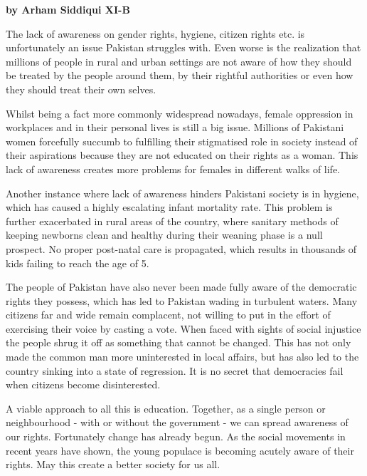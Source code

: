 \documentclass{article}
\begin{document}


\textbf{by Arham Siddiqui XI-B}

The lack of awareness on gender rights, hygiene, citizen rights etc. is unfortunately an issue Pakistan struggles with. Even worse is the realization that millions of people in rural and urban settings are not aware of how they should be treated by the people around them, by their rightful authorities or even how they should treat their own selves. 

Whilst being a fact more commonly widespread nowadays, female oppression in workplaces and in their personal lives is still a big issue. Millions of Pakistani women forcefully succumb to fulfilling their stigmatised role in society instead of their aspirations because they are not educated on their rights as a woman. This lack of awareness creates more problems for females in different walks of life.

Another instance where lack of awareness hinders Pakistani society is in hygiene, which has caused a highly escalating infant mortality rate. This problem is further exacerbated in rural areas of the country, where sanitary methods of keeping newborns clean and healthy during their weaning phase is a null prospect. No proper post-natal care is propagated, which results in thousands of kids failing to reach the age of 5. 

The people of Pakistan have also never been made fully aware of the democratic rights they possess, which has led to Pakistan wading in turbulent waters. Many citizens far and wide remain complacent, not willing to put in the effort of exercising their voice by casting a vote. When faced with sights of social injustice the people shrug it off as something that cannot be changed. This has not only made the common man more uninterested in local affairs, but has also led to the country sinking into a state of regression. It is no secret that democracies fail when citizens become disinterested. 

A viable approach to all this is education. Together, as a single person or neighbourhood - with or without the government - we can spread awareness of our rights. Fortunately change has already begun. As the social movements in recent years have shown, the young populace is becoming acutely aware of their rights. May this create a better society for us all.
\end{document}
